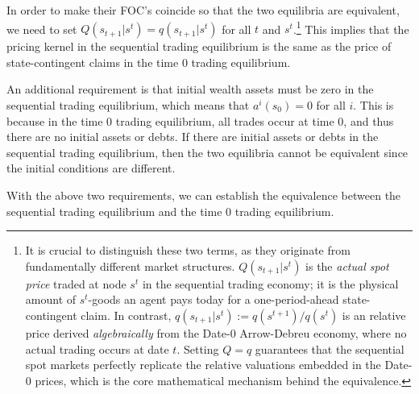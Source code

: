 In order to make their FOC's coincide so that the two equilibria are equivalent, we need to set $Q(s_{t+1}|s^t) = q(s_{t+1}|s^t)$ for all $t$ and $s^t$.\footnote{
    It is crucial to distinguish these two terms, as they originate from fundamentally different market structures. 
    $Q(s_{t+1}|s^t)$ is the \textit{actual spot price} traded at node $s^t$ in the sequential trading economy; it is the physical amount of $s^t$-goods an agent pays today for a one-period-ahead state-contingent claim. 
    In contrast, $q(s_{t+1}|s^t) := q(s^{t+1})/q(s^t)$ is an relative price derived \textit{algebraically} from the Date-0 Arrow-Debreu economy, where no actual trading occurs at date $t$. 
    Setting $Q = q$ guarantees that the sequential spot markets perfectly replicate the relative valuations embedded in the Date-0 prices, which is the core mathematical mechanism behind the equivalence.
} This implies that the pricing kernel in the sequential trading equilibrium is the same as the price of state-contingent claims in the time 0 trading equilibrium.

An additional requirement is that initial wealth assets must be zero in the sequential trading equilibrium, which means that $a^i(s_0) = 0$ for all $i$. This is because in the time 0 trading equilibrium, all trades occur at time 0, and thus there are no initial assets or debts. If there are initial assets or debts in the sequential trading equilibrium, then the two equilibria cannot be equivalent since the initial conditions are different.

With the above two requirements, we can establish the equivalence between the sequential trading equilibrium and the time 0 trading equilibrium.

